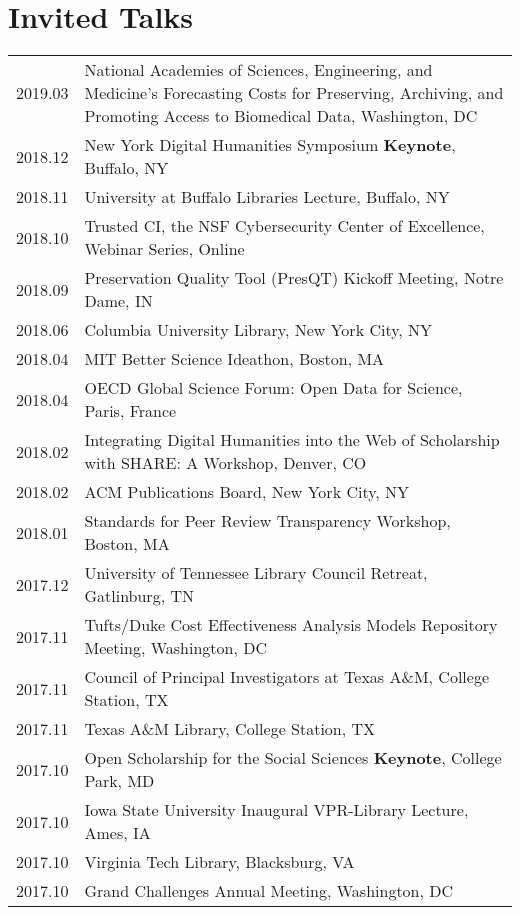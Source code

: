 \documentclass[11pt]{article}
\begin{document}
\section*{Invited Talks}
\begin{tabularx}{\textwidth}{lX}
    2019.03     & National Academies of Sciences, Engineering, and Medicine's Forecasting Costs for Preserving, Archiving, and Promoting Access to Biomedical Data, Washington, DC\\
    2018.12     & New York Digital Humanities Symposium \textbf{Keynote}, Buffalo, NY\\
    2018.11     & University at Buffalo Libraries Lecture, Buffalo, NY\\
    2018.10     & Trusted CI, the NSF Cybersecurity Center of Excellence, Webinar Series, Online \\
 	2018.09     & Preservation Quality Tool (PresQT) Kickoff Meeting, Notre Dame, IN\\
 	2018.06     & Columbia University Library, New York City, NY\\
    2018.04     & MIT Better Science Ideathon, Boston, MA\\
    2018.04     & OECD Global Science Forum: Open Data for Science, Paris, France\\
    2018.02     & Integrating Digital Humanities into the Web of Scholarship with SHARE: A Workshop, Denver, CO\\
    2018.02     & ACM Publications Board, New York City, NY\\
    2018.01     & Standards for Peer Review Transparency Workshop, Boston, MA\\
    2017.12     & University of Tennessee Library Council Retreat, Gatlinburg, TN\\
    2017.11     & Tufts/Duke Cost Effectiveness Analysis Models Repository Meeting, Washington, DC\\
    2017.11     & Council of Principal Investigators at Texas A\&M, College Station, TX\\
    2017.11     & Texas A\&M Library, College Station, TX\\
    2017.10     & Open Scholarship for the Social Sciences \textbf{Keynote}, College Park, MD\\
    2017.10     & Iowa State University Inaugural VPR-Library Lecture, Ames, IA\\
    2017.10     & Virginia Tech Library, Blacksburg, VA\\
    2017.10     & Grand Challenges Annual Meeting, Washington, DC \\

\end{tabularx}
\end{document}
